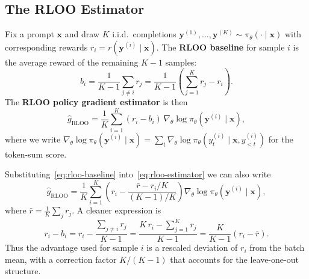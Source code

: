 \subsection{The RLOO Estimator}


Fix a prompt $\mathbf{x}$ and draw $K$ i.i.d.\ completions $\mathbf{y}^{(1)}, \ldots, \mathbf{y}^{(K)} \sim \pi_\theta(\cdot \mid \mathbf{x})$ with corresponding rewards $r_i = r(\mathbf{y}^{(i)} \mid \mathbf{x})$.  The \textbf{RLOO baseline} for sample $i$ is the average reward of the remaining $K-1$ samples:
\begin{equation}
\label{eq:rloo-baseline}
b_i = \frac{1}{K-1} \sum_{j \neq i} r_j = \frac{1}{K-1}\left(\sum_{j=1}^K r_j - r_i\right).
\end{equation}
The \textbf{RLOO policy gradient estimator} is then
\begin{equation}
\label{eq:rloo-estimator}
\hat g_{\text{RLOO}} = \frac{1}{K} \sum_{i=1}^K (r_i - b_i)\, \nabla_\theta \log \pi_\theta(\mathbf{y}^{(i)} \mid \mathbf{x}),
\end{equation}
where we write $\nabla_\theta \log \pi_\theta(\mathbf{y}^{(i)} \mid \mathbf{x}) = \sum_{t} \nabla_\theta \log \pi_\theta(y^{(i)}_t \mid \mathbf{x}, y^{(i)}_{<t})$ for the token-sum score.

Substituting~\eqref{eq:rloo-baseline} into~\eqref{eq:rloo-estimator} we can also write
\begin{equation}
\label{eq:rloo-expanded}
\hat g_{\text{RLOO}} = \frac{1}{K} \sum_{i=1}^K \left(r_i - \frac{\bar r - r_i / K}{(K-1)/K}\right) \nabla_\theta \log \pi_\theta(\mathbf{y}^{(i)} \mid \mathbf{x}),
\end{equation}
where $\bar r = \frac{1}{K}\sum_j r_j$.  A cleaner expression is
\begin{equation}
\label{eq:rloo-clean}
r_i - b_i = r_i - \frac{\sum_{j \neq i} r_j}{K-1} = \frac{K\, r_i - \sum_{j=1}^K r_j}{K-1} = \frac{K}{K-1}\!\left(r_i - \bar r\right).
\end{equation}
Thus the advantage used for sample $i$ is a rescaled deviation of $r_i$ from the batch mean, with a correction factor $K/(K-1)$ that accounts for the leave-one-out structure.

\begin{algorithm}[ht]
\caption{RLOO Policy Gradient Update}
\label{alg:rloo}
\end{algorithm}

